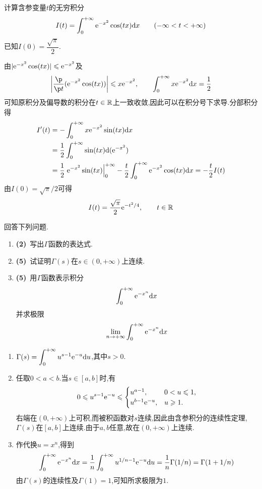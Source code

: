 \documentclass{ctexart}
\begin{document}
\begin{problem}[6.(10\songti{分})]
计算含参变量$t$的无穷积分
        \[I(t)=\int_0^{+\infty}\mathrm{e}^{-x^2}\cos(tx)\mathrm{d} x\qquad(-\infty<t<+\infty)\]
        已知$I(0)=\dfrac{\sqrt{\pi}}{2}$.
\end{problem}
\begin{solution}
由$|\mathrm{e}^{-x^2}\cos(tx)|\leqslant\mathrm{e}^{-x^2}$及
\[\left|\frac{\p}{\p t}(\e^{-x^2}\cos(tx))\right|\leqslant x\e^{-x^2},\qquad
\int_0^{+\infty}x\e^{-x^2}\di x=\frac12\]
可知原积分及偏导数的积分在$t\in\mathbb{R}$上一致收敛,因此可以在积分号下求导.分部积分得
\[\begin{aligned}
I'(t)&=-\int_0^{+\infty}x\mathrm{e}^{-x^2}\sin(tx)\mathrm{d} x\\
&=\frac12\int_0^{+\infty}\sin(tx)\mathrm{d}(\mathrm{e}^{-x^2})\\
&=\frac12\left.\mathrm{e}^{-x^2}\sin(tx)\right|_0^{+\infty}
-\frac t2\int_0^{+\infty}\mathrm{e}^{-x^2}\cos(tx)\mathrm{d} x=-\frac t2 I(t)
\end{aligned}\]
由$I(0)=\sqrt\pi/2$可得
\[I(t)=\frac{\sqrt\pi}{2}\mathrm{e}^{-t^2/4},\qquad t\in\mathbb{R}\]
\end{solution}

\begin{problem}[7.(12\songti{分})]
回答下列问题.
        \begin{enumerate}[label=\tbf{(\arabic*)},topsep=0pt,parsep=0pt,itemsep=0pt,partopsep=0pt]
            \item \textbf{(2)}\ 写出$\Gamma$函数的表达式.
            \item \textbf{(5)}\ 试证明$\Gamma(s)$在$s\in(0,+\infty)$上连续.
            \item \textbf{(5)}\ 用$\Gamma$函数表示积分
                \[\int_0^{+\infty}\mathrm{e}^{-x^n}\mathrm{d} x\]
                并求极限
                \[\lim_{n\to+\infty}\int_0^{+\infty}\mathrm{e}^{-x^n}\mathrm{d} x\]

        \end{enumerate}
\end{problem}
\begin{solution}
\begin{enumerate}[label=\tbf{(\arabic*)},topsep=0pt,parsep=0pt,itemsep=0pt,partopsep=0pt]
\item $\displaystyle\Gamma(s)=\int_0^{+\infty}u^{s-1}\mathrm{e}^{-u}\mathrm{d} u$,其中$s>0$.
\item 任取$0<a<b$.当$s\in[a,b]$时,有
\[0\leqslant u^{s-1}\mathrm{e}^{-u}\leqslant
\begin{cases}u^{a-1},&0<u\leqslant1,\\u^{b-1}\mathrm{e}^{-u},&u\geqslant1.\end{cases}\]
右端在$(0,+\infty)$上可积,而被积函数对$s$连续,因此由含参积分的连续性定理,$\Gamma(s)$在$[a,b]$上连续.由于$a,b$任意,故在$(0,+\infty)$上连续.
\item 作代换$u=x^n$,得到
\[\int_0^{+\infty}\mathrm{e}^{-x^n}\mathrm{d} x
=\frac1n\int_0^{+\infty}u^{1/n-1}\mathrm{e}^{-u}\mathrm{d} u
=\frac1n\Gamma(1/n)=\Gamma(1+1/n)\]
由$\Gamma(s)$的连续性及$\Gamma(1)=1$,可知所求极限为$1$.
\end{enumerate}
\end{solution}
\end{document}
